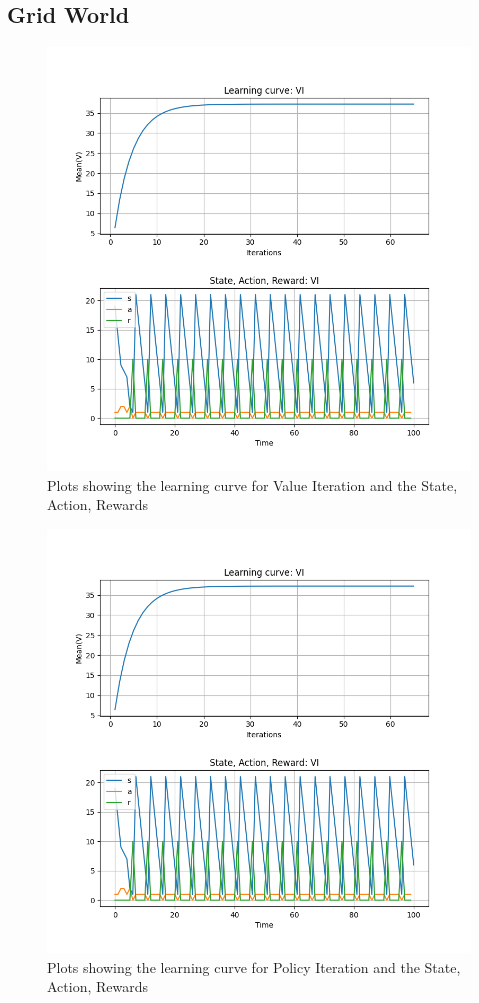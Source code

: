 \documentclass[conf]{new-aiaa}
\begin{document}
\subsection{Grid World}
\begin{figure}[H]
\centering
\includegraphics[width=30pc]{figs/gw/learning_and_trajectory_vi.png}
\caption{Plots showing the learning curve for Value Iteration and the State, Action, Rewards}
\label{fig_env1}
\end{figure}

\begin{figure}[H]
\centering
\includegraphics[width=30pc]{figs/gw/learning_and_trajectory_vi.png}
\caption{Plots showing the learning curve for Policy Iteration and the State, Action, Rewards}
\label{fig_env1}
\end{figure}
\end{document}
